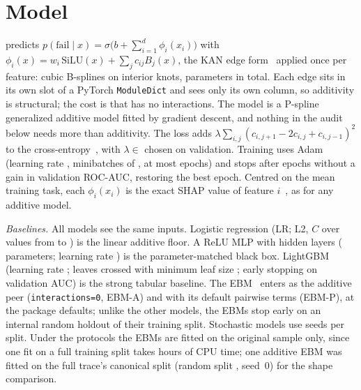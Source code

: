 \section{Model}
\label{sec:model}

\kaam{} predicts $p(\text{fail}\mid x)=\sigma\big(b+\sum_{i=1}^{d}\phi_i(x_i)\big)$ with $\phi_i(x)=w_i\,\mathrm{SiLU}(x)+\sum_j c_{ij}B_j(x)$, the KAN edge form~\cite{liu2025kan} applied once per feature: cubic B-splines on  interior knots,  parameters in total. Each edge sits in its own slot of a PyTorch \texttt{ModuleDict} and sees only its own column, so additivity is structural; the cost is that \kaam{} has no interactions. The model is a P-spline generalized additive model fitted by gradient descent, and nothing in the audit below needs more than additivity. The loss adds $\lambda\sum_{i,j}(c_{i,j+1}-2c_{i,j}+c_{i,j-1})^2$ to the cross-entropy~\cite{eilers1996psplines}, with $\lambda\in$ chosen on validation. Training uses Adam~\cite{kingma2015adam} (learning rate , minibatches of , at most  epochs) and stops after  epochs without a gain in validation ROC-AUC, restoring the best epoch. Centred on the mean training task, each $\phi_i(x_i)$ is the exact SHAP value of feature $i$~\cite{lundberg2017shap}, as for any additive model.

\emph{Baselines.} All models see the same inputs. Logistic regression (LR; L2, $C$ over  values from  to ) is the linear additive floor. A ReLU MLP with hidden layers  ( parameters; learning rate ) is the parameter-matched black box. LightGBM~\cite{ke2017lightgbm} (learning rate ;  leaves crossed with minimum leaf size ; early stopping on validation AUC) is the strong tabular baseline. The EBM~\cite{nori2019interpretml} enters as the additive peer (\texttt{interactions=0}, EBM-A) and with its default pairwise terms (EBM-P), at the package defaults; unlike the other models, the EBMs stop early on an internal random holdout of their training split. Stochastic models use  seeds per split. Under the protocols the EBMs are fitted on the original sample only, since one fit on a full training split takes hours of CPU time; one additive EBM was fitted on the full trace's canonical split (random split , seed~0) for the shape comparison.
